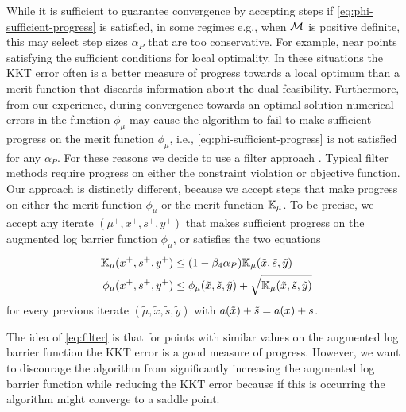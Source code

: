 \documentclass{article}
\begin{document}
While it is sufficient to guarantee convergence by accepting steps if \eqref{eq:phi-sufficient-progress} is satisfied, in some regimes e.g., when $\mathcal{M}$ is positive definite, this may select step sizes $\alpha_{P}$ that are too conservative.  For example, near points satisfying the sufficient conditions for local optimality. In these situations the KKT error often is a better measure of progress towards a local optimum than a merit function that discards information about the dual feasibility. Furthermore, from our experience, during convergence towards an optimal solution numerical errors in the function $\phi_{\mu}$ may cause the algorithm to fail to make sufficient progress on the merit function $\phi_{\mu}$, i.e., \eqref{eq:phi-sufficient-progress} is not satisfied for any $\alpha_{P}$. For these reasons we decide to use a filter approach \cite{fletcher2002nonlinear,wachter2006implementation}. Typical filter methods \cite{fletcher2002nonlinear} require progress on either the constraint violation or objective function. Our approach is distinctly different, because we accept steps that make progress on either the merit function $\phi_{\mu}$ or the merit function $\mathbb{K}_{\mu}$.
To be precise, we accept any iterate $(\mu^{+}, x^{+}, s^{+}, y^{+})$ that makes sufficient progress on the augmented log barrier function $\phi_{\mu}$, or satisfies the two equations
\begin{subequations}\label{eq:filter}
\begin{flalign}
\meritKKT_{\mu} (x^{+}, s^{+}, y^{+}) &\le (1 - \parKKTReductFactor \alpha_{P} ) \meritKKT_{\mu} (\tilde{x}, \tilde{s}, \tilde{y}) \label{eq:kkt-progress} \\
\phi_{\mu}(x^{+}, s^{+}, y^{+}) &\le \phi_{\mu}(\tilde{x}, \tilde{s}, \tilde{y}) + \sqrt{\meritKKT_{\mu} (\tilde{x}, \tilde{s}, \tilde{y})} %
\end{flalign} %
\end{subequations}
 for every previous iterate $(\tilde{\mu}, \tilde{x}, \tilde{s}, \tilde{y})$ with $a(\tilde{x}) + \tilde{s} = a(x) + s$.

The idea of \eqref{eq:filter} is that for points with similar values on the augmented log barrier function the KKT error is a good measure of progress. However, we want to discourage the algorithm from significantly increasing the augmented log barrier function while reducing the KKT error because if this is occurring the algorithm might converge to a saddle point. 
\end{document}
